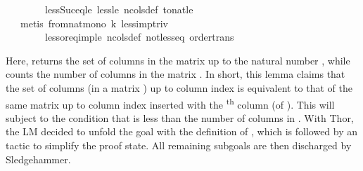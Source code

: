 \documentclass{article}
\begin{document}
\begin{mdframed}
\begin{isabelle}
\ \ \ \ \ \ \ \ less{\isacharunderscore}{\kern0pt}Suc{\isacharunderscore}{\kern0pt}eq{\isacharunderscore}{\kern0pt}le\ less{\isacharunderscore}{\kern0pt}le\ ncols{\isacharunderscore}{\kern0pt}def\ to{\isacharunderscore}{\kern0pt}nat{\isacharunderscore}{\kern0pt}le{\isacharparenright}{\kern0pt}\isanewline
\ \ \isamarkupfalse \ {\isacharparenleft}{\kern0pt}metis\ from{\isacharunderscore}{\kern0pt}nat{\isacharunderscore}{\kern0pt}mono{\isacharprime}{\kern0pt}\ k\ less{\isacharunderscore}{\kern0pt}imp{\isacharunderscore}{\kern0pt}triv\ \isanewline
\ \ \ \ \ \ \ \ less{\isacharunderscore}{\kern0pt}or{\isacharunderscore}{\kern0pt}eq{\isacharunderscore}{\kern0pt}imp{\isacharunderscore}{\kern0pt}le\ ncols{\isacharunderscore}{\kern0pt}def\ not{\isacharunderscore}{\kern0pt}less{\isacharunderscore}{\kern0pt}eq\ order{\isacharunderscore}{\kern0pt}trans{\isacharparenright}{\kern0pt}\end{isabelle}
\end{mdframed}
Here,  returns the set of columns in the matrix  up to the natural number , while  counts the number of columns in the matrix . In short, this lemma claims that the set of columns (in a matrix ) up to column index  is equivalent to that of the same matrix up to column index  inserted with the \textsuperscript{th} column (of ). This will subject to the condition that  is less than the number of columns in . With Thor, the LM decided to unfold the goal with the definition of , which is followed by an  tactic to simplify the proof state. All remaining subgoals are then discharged by Sledgehammer.
\end{document}
